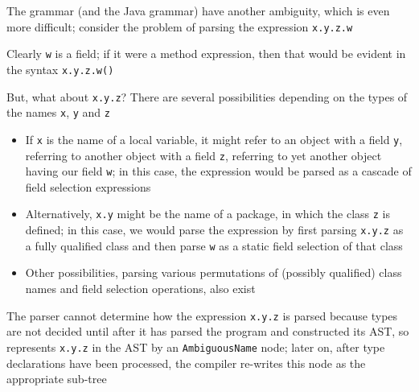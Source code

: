 \documentclass[8pt,a4paper,compress,handout]{beamer}
\begin{document}
\begin{frame}[fragile]
\pause

The \jmm grammar (and the Java grammar) have another ambiguity, which is even more difficult; consider the problem of parsing the expression \lstinline{x.y.z.w}

\pause
\bigskip

Clearly \lstinline{w} is a field; if it were a method expression, then that would be evident in the syntax \lstinline{x.y.z.w()}

\pause
\bigskip

But, what about \lstinline{x.y.z}?  There are several possibilities depending on the types of the names \lstinline{x}, \lstinline{y} and \lstinline{z}

\begin{itemize}
\item If \lstinline{x} is the name of a local variable, it might refer to an object with a field \lstinline{y}, referring to another object with a field \lstinline{z}, referring to yet another object having our field \lstinline{w}; in this case, the expression would be parsed as a cascade of field selection expressions

\item Alternatively, \lstinline{x.y} might be the name of a package, in which the class \lstinline{z} is defined; in this case, we would parse the expression by first parsing \lstinline{x.y.z} as a fully qualified class and then parse \lstinline{w} as a static field selection of that class

\item Other possibilities, parsing various permutations of (possibly qualified) class names and field selection operations, also exist
\end{itemize}

\pause
\bigskip

The parser cannot determine how the expression \lstinline{x.y.z} is parsed because types are not decided until after it has parsed the program and constructed its AST, so represents \lstinline{x.y.z} in the AST by an \lstinline{AmbiguousName} node; later on, after type declarations have been processed, the compiler re-writes this node as the appropriate sub-tree
\end{frame}
\end{document}
